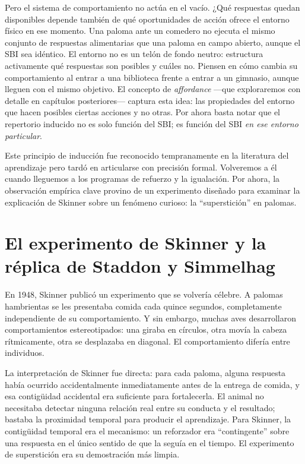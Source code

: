 \documentclass[
  letterpaper,
  DIV=11,
  numbers=noendperiod]{scrreprt}
\begin{document}
\begin{tcolorbox}[enhanced jigsaw, arc=.35mm, bottomrule=.15mm, breakable, colback=white, colframe=quarto-callout-note-color-frame, left=2mm, leftrule=.75mm, opacityback=0, rightrule=.15mm, toprule=.15mm]
Pero el sistema de comportamiento no actúa en el vacío. ¿Qué respuestas
quedan disponibles depende también de qué oportunidades de acción ofrece
el entorno físico en ese momento. Una paloma ante un comedero no ejecuta
el mismo conjunto de respuestas alimentarias que una paloma en campo
abierto, aunque el SBI sea idéntico. El entorno no es un telón de fondo
neutro: estructura activamente qué respuestas son posibles y cuáles no.
Piensen en cómo cambia su comportamiento al entrar a una biblioteca
frente a entrar a un gimnasio, aunque lleguen con el mismo objetivo. El
concepto de \emph{affordance} ---que exploraremos con detalle en
capítulos posteriores--- captura esta idea: las propiedades del entorno
que hacen posibles ciertas acciones y no otras. Por ahora basta notar
que el repertorio inducido no es solo función del SBI; es función del
SBI \emph{en ese entorno particular}.

Este principio de inducción fue reconocido tempranamente en la
literatura del aprendizaje pero tardó en articularse con precisión
formal. Volveremos a él cuando lleguemos a los programas de refuerzo y
la igualación. Por ahora, la observación empírica clave provino de un
experimento diseñado para examinar la explicación de Skinner sobre un
fenómeno curioso: la ``superstición'' en palomas.

\section{El experimento de Skinner y la réplica de Staddon y
Simmelhag}\label{el-experimento-de-skinner-y-la-ruxe9plica-de-staddon-y-simmelhag}

En 1948, Skinner publicó un experimento que se volvería célebre. A
palomas hambrientas se les presentaba comida cada quince segundos,
completamente independiente de su comportamiento. Y sin embargo, muchas
aves desarrollaron comportamientos estereotipados: una giraba en
círculos, otra movía la cabeza rítmicamente, otra se desplazaba en
diagonal. El comportamiento difería entre individuos.

La interpretación de Skinner fue directa: para cada paloma, alguna
respuesta había ocurrido accidentalmente inmediatamente antes de la
entrega de comida, y esa contigüidad accidental era suficiente para
fortalecerla. El animal no necesitaba detectar ninguna relación real
entre su conducta y el resultado; bastaba la proximidad temporal para
producir el aprendizaje. Para Skinner, la contigüidad temporal era el
mecanismo: un reforzador era ``contingente'' sobre una respuesta en el
único sentido de que la seguía en el tiempo. El experimento de
superstición era su demostración más limpia.


\end{tcolorbox}
\end{document}
